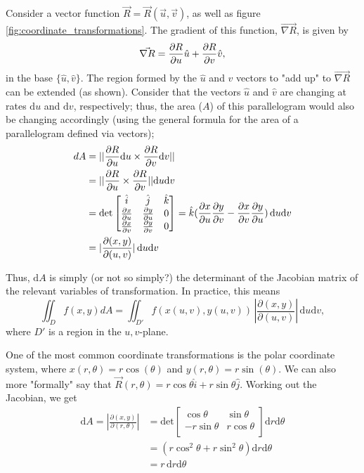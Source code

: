 \documentclass[12pt]{article}
\begin{document}
{Consider a vector function $\vec{R} = \vec{R}(\vec{u}, \vec{v})$, as well as figure \ref{fig:coordinate_transformations}. The gradient of this function, $\vec{\nabla R}$, is given by \[\vec{\nabla R} = \frac{\partial R}{\partial u} \hat{u} + \frac{\partial R}{\partial v} \hat{v},\] in the base $\{\hat{u}, \hat{v}\}$. The region formed by the $\hat{u}$ and $\hat{v}$ vectors to "add up" to $\vec{\nabla R}$ can be extended (as shown). Consider that the vectors $\hat{u}$ and $\hat{v}$ are changing at rates $\text{d}u$ and $\text{d}v$, respectively; thus, the area ($A$) of this parallelogram would also be changing accordingly (using the general formula for the area of a parallelogram defined via vectors); \begin{align*}
    dA &= ||\frac{\partial R}{\partial u}\text{d}u  \times \frac{\partial R}{\partial v}\text{d}v||\\
    &=  ||\frac{\partial R}{\partial u} \times \frac{\partial R}{\partial v}||\text{d}u \text{d}v\\
    &= \text{det}\begin{bmatrix}
        \hat{i} & \hat{j} & \hat{k}\\
        \frac{\partial x}{\partial u} & \frac{\partial y}{\partial u} & 0\\
        \frac{\partial x}{\partial v} & \frac{\partial y}{\partial v} & 0\\
    \end{bmatrix}= \hat{k}(\frac{\partial x}{\partial u} \frac{\partial y}{\partial v} - \frac{\partial x}{\partial v} \frac{\partial y}{\partial u})\,\text{d}u \text{d}v\\
    &= |\frac{\partial(x,y)}{\partial(u,v)}|\,\text{d}u \text{d}v
\end{align*}

Thus, $\text{d}A$ is simply (or not so simply?) the determinant of the Jacobian matrix of the relevant variables of transformation. In practice, this means \[\iint_D f(x,y) dA = \iint_{D'} f(x(u,v), y(u,v))\, |\frac{\partial(x,y)}{\partial(u,v)}|\,\text{d}u \text{d}v,\] where $D'$ is a region in the $u,v$-plane.

One of the most common coordinate transformations is the polar coordinate system, where $x(r,\theta) = r \cos (\theta)$ and $y(r, \theta) = r \sin(\theta)$. We can also more "formally" say that $\vec{R}(r, \theta) = r \cos \theta \hat{i} + r \sin \theta \hat{j}$. Working out the Jacobian, we get \begin{align*}
    \text{d}A = |\frac{\partial(x,y)}{\partial(r,\theta)}| &= \text{det}\begin{bmatrix}
       \cos \theta & \sin \theta\\
        -r \sin \theta & r \cos \theta\\
    \end{bmatrix} \text{d}r \text{d}\theta\\
    &=  (r\cos^2 \theta + r \sin^2 \theta) \text{d}r \text{d}\theta \\
    &= r\,\text{d}r \text{d}\theta
\end{align*}

}
\end{document}
